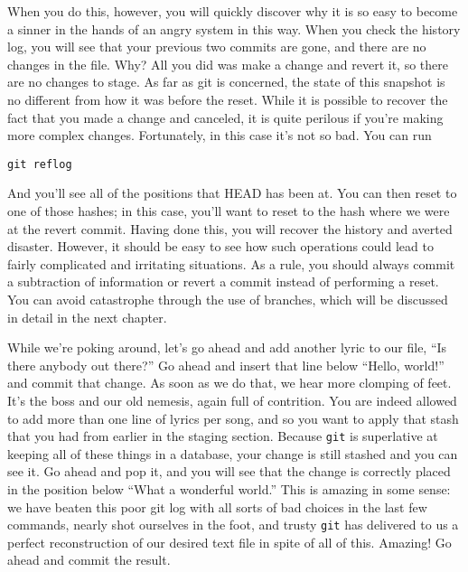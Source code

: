 {\par{
When you do this, however, you will quickly discover why it is so easy to
become a sinner in the hands of an angry system in this way. When you check
the history log, you will see that your previous two commits are gone, and
there are no changes in the file. Why? All you did was make a change and
revert it, so there are no changes to stage. As far as git is concerned, the
state of this snapshot is no different from how it was before the reset. While
it is possible to recover the fact that you made a change and canceled, it is
quite perilous if you're making more complex changes. Fortunately, in this
case it's not so bad. You can run
}

\begin{verbatim}
git reflog
\end{verbatim}

\par{
And you'll see all of the positions that HEAD has been at. You can then reset
to one of those hashes; in this case, you'll want to reset to the hash where
we were at the revert commit. Having done this, you will recover the history
and averted disaster. However, it should be easy to see how such operations
could lead to fairly complicated and irritating situations. As a rule, you
should always commit a subtraction of information or revert a commit instead
of performing a reset. You can avoid catastrophe through the use of branches,
which will be discussed in detail in the next chapter.
}

\par{
While we're poking around, let's go ahead and add another lyric to our file, 
``Is there anybody out there?''
Go ahead and insert that line below ``Hello, world!'' and commit that change.
As soon as we do that, we hear more clomping of feet. It's the boss and our
old nemesis, again full of contrition. You are indeed allowed to add more than
one line of lyrics per song, and so you want to apply that stash that you had
from earlier in the staging section. Because \verb+git+ is superlative at
keeping all of these things in a database, your change is still stashed and
you can see it. Go ahead and pop it, and you will see that the change is
correctly placed in the position below ``What a wonderful world.'' This is
amazing in some sense: we have beaten this poor git log with all sorts of bad
choices in the last few commands, nearly shot ourselves in the foot, and
trusty \verb+git+ has delivered to us a perfect reconstruction of our desired
text file in spite of all of this. Amazing! Go ahead and commit the result.
}

}
